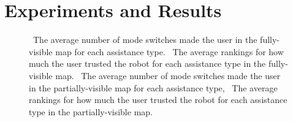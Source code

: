 \section{Experiments and Results}
\label{sec:experiments}

\begin{figure}[t!]
    \centering
        \label{fig:charts}
         \caption{\protect{}~The average number of mode switches made the user in the fully-visible map for each assistance type. \protect{}~The average rankings for how much the user trusted the robot for each assistance type in the fully-visible map. \protect{}~The average number of mode switches made the user in the partially-visible map for each assistance type, \protect{}~The average rankings for how much the user trusted the robot for each assistance type in the partially-visible map. }
\end{figure}

